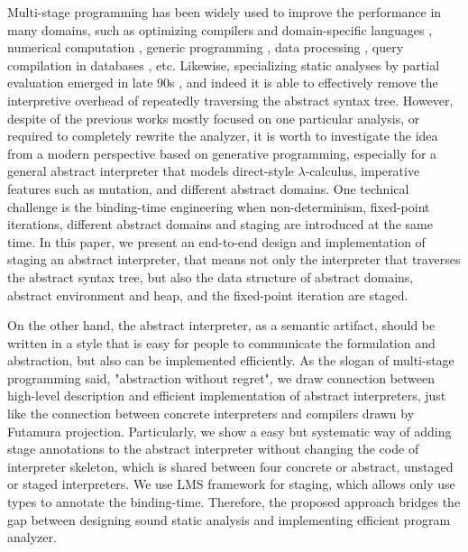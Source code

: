 Multi-stage programming has been widely used to improve the performance in many domains, 
such as optimizing compilers and domain-specific languages \cite{DBLP:conf/pldi/RompfSBLCO14, DBLP:conf/snapl/RompfBLSJAOSKDK15,
DBLP:journals/tecs/SujeethBLRCOO14, DBLP:conf/gpce/SujeethGBLROO13, DBLP:journals/jfp/CaretteKS09},
numerical computation \cite{PGL-038, DBLP:conf/pepm/AktemurKKS13}, 
generic programming \cite{DBLP:journals/pacmpl/Yallop17, Ofenbeck:2017:SGP:3136040.3136060}, 
data processing \cite{DBLP:conf/oopsla/JonnalageddaCSRO14, DBLP:conf/popl/KiselyovBPS17}, 
query compilation in databases \cite{DBLP:conf/osdi/EssertelTDBOR18, DBLP:conf/sigmod/TahboubER18},
etc.
Likewise, specializing static analyses by partial evaluation emerged in late 90s 
\cite{damian1999partial, amtoft1999partial, Boucher:1996:ACN:647473.727587, ashley:practical}, 
and indeed it is able to effectively remove the interpretive overhead of repeatedly traversing 
the abstract syntax tree. 
However, despite of the previous works mostly focused on one particular analysis, or required to 
completely rewrite the analyzer,
it is worth to investigate the idea from a modern perspective based on generative programming,
especially for a general abstract interpreter that models direct-style $\lambda$-calculus, imperative 
features such as mutation, and different abstract domains.
One technical challenge is the binding-time engineering when non-determinism, 
fixed-point iterations, different abstract domains and staging are introduced at the same time.
In this paper, we present an end-to-end design and implementation of staging an abstract interpreter,
that means not only the interpreter that traverses the abstract syntax tree, 
but also the data structure of abstract domains, abstract environment and heap, 
and the fixed-point iteration are staged.

On the other hand, the abstract interpreter, as a semantic artifact, should be written in a 
style that is easy for people to communicate the formulation and abstraction, but also can be 
implemented efficiently. As the slogan of multi-stage programming said, "abstraction without regret",
we draw connection between high-level description and efficient implementation of abstract interpreters,
just like the connection between concrete interpreters and compilers drawn by Futamura projection.
Particularly, we show a easy but systematic way of adding stage annotations to the abstract interpreter
without changing the code of interpreter skeleton, which is shared between four concrete or abstract,
unstaged or staged interpreters. We use LMS framework for staging, which allows only use types to 
annotate the binding-time. Therefore, the proposed approach bridges the gap between designing sound 
static analysis and implementing efficient program analyzer.


